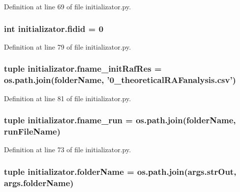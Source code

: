 Definition at line 69 of file initializator.\+py.

\hypertarget{a00137_afdd976dc87dc056c8cba6926f9f98287}{
\subsubsection[{fidid}]{\setlength{\rightskip}{0pt plus 5cm}int initializator.\+fidid = 0}}\label{a00137_afdd976dc87dc056c8cba6926f9f98287}


Definition at line 79 of file initializator.\+py.

\hypertarget{a00137_a139a15a6b4127dd23049cb2b91a85d77}{
\subsubsection[{fname\+\_\+init\+Raf\+Res}]{\setlength{\rightskip}{0pt plus 5cm}tuple initializator.\+fname\+\_\+init\+Raf\+Res = os.\+path.\+join({\bf folder\+Name}, '0\+\_\+theoretical\+R\+A\+Fanalysis.\+csv')}}\label{a00137_a139a15a6b4127dd23049cb2b91a85d77}


Definition at line 81 of file initializator.\+py.

\hypertarget{a00137_a6bc5100ec1c6492cec974172df243857}{
\subsubsection[{fname\+\_\+run}]{\setlength{\rightskip}{0pt plus 5cm}tuple initializator.\+fname\+\_\+run = os.\+path.\+join({\bf folder\+Name}, {\bf run\+File\+Name})}}\label{a00137_a6bc5100ec1c6492cec974172df243857}


Definition at line 73 of file initializator.\+py.

\hypertarget{a00137_aa51c106700ef9afbdb94a1c800e10569}{
\subsubsection[{folder\+Name}]{\setlength{\rightskip}{0pt plus 5cm}tuple initializator.\+folder\+Name = os.\+path.\+join(args.\+str\+Out, args.\+folder\+Name)}}\label{a00137_aa51c106700ef9afbdb94a1c800e10569}



